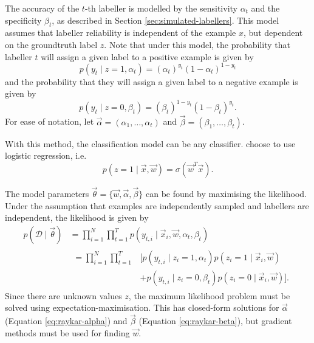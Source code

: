         The accuracy of the $t$-th labeller is modelled by the sensitivity
        $\alpha_t$ and the specificity $\beta_t$, as described in Section
        \ref{sec:simulated-labellers}. This model assumes that labeller
        reliability is independent of the example $x$, but dependent on the
        groundtruth label $z$. Note that under this model, the probability that
        labeller $t$ will assign a given label to a positive example is given by
        \begin{equation*}
            p(y_t \mid z = 1, \alpha_t) =
                (\alpha_t)^{y_t} (1 - \alpha_t)^{1 - y_t}
        \end{equation*}
        and the probability that they will assign a given label to a negative
        example is given by
        \begin{equation*}
            p(y_t \mid z = 0, \beta_t) =
                (\beta_t)^{1 - y_t} (1 - \beta_t)^{y_t}.
        \end{equation*}
        For ease of notation, let $\vec \alpha = (\alpha_1, \dots, \alpha_t)$
        and $\vec \beta = (\beta_1, \dots, \beta_t)$.

        With this method, the classification model can be any classifier.
        \citeauthor{raykar10} choose to use logistic regression, i.e.
        \begin{equation}
            \label{eq:raykar-logreg}
            p(z = 1 \mid \vec x, \vec w) = \sigma(\vec w^T \vec x).
        \end{equation}

        The model parameters $\vec \theta = \{\vec w, \vec \alpha, \vec \beta\}$
        can be found by maximising the likelihood. Under the assumption that
        examples are independently sampled and labellers are independent, the
        likelihood is given by
        \begin{align*}
            p(\mathcal D \mid \vec \theta) &=
                \prod_{i = 1}^N
                    \prod_{t = 1}^T
                        p(y_{t, i} \mid \vec x_i, \vec w, \alpha_t, \beta_t)\\
            &\begin{aligned}=
                \prod_{i = 1}^N
                    \prod_{t = 1}^T
                        &\bigg[p(y_{t, i} \mid z_i = 1, \alpha_t)
                            p(z_i = 1 \mid \vec x_i, \vec w)\\
                        &+ p(y_{t, i} \mid z_i = 0, \beta_t)
                            p(z_i = 0 \mid \vec x_i, \vec w)\bigg].
             \end{aligned}
        \end{align*}
        Since there are unknown values $z$, the maximum likelihood problem must
        be solved using expectation-maximisation. This has closed-form solutions
        for $\vec \alpha$ (Equation \ref{eq:raykar-alpha}) and $\vec \beta$
        (Equation \ref{eq:raykar-beta}), but gradient methods must be used for
        finding $\vec w$.

